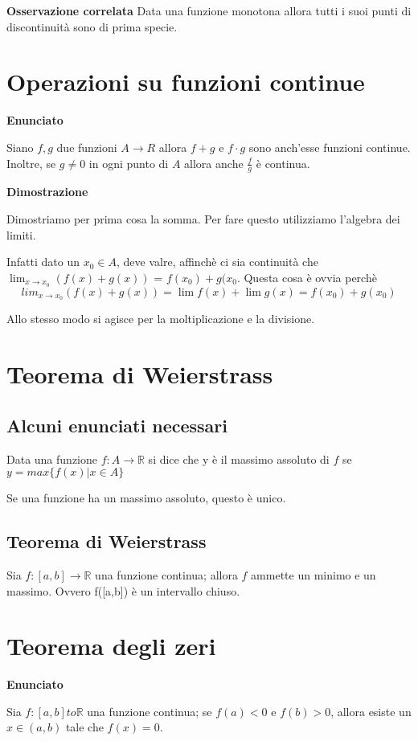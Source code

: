 \textbf{Osservazione correlata} Data una funzione monotona allora tutti i suoi punti di discontinuità sono di prima specie.

\section{Operazioni su funzioni continue}

\textbf{Enunciato}

Siano $f,g$ due funzioni $A\to R$ allora $f+g$ e $f\cdot g$ sono anch'esse funzioni continue. Inoltre, se $g \neq 0$ in ogni punto di $A$ allora anche $\frac{f}{g}$ è continua.

\textbf{Dimostrazione}

Dimostriamo per prima cosa la somma. Per fare questo utilizziamo l'algebra dei limiti. 

Infatti dato un $x_0 \in A$, deve valre, affinchè ci sia continuità che $\lim_{x\to x_0}(f(x)+g(x))$ = $f(x_0)+g(x_0$. Questa cosa è ovvia perchè $$lim_{x\to x_0}(f(x)+g(x)) = \lim f(x) + \lim g(x) = f(x_0) + g(x_0)$$

Allo stesso modo si agisce per la moltiplicazione e la divisione.

\section{Teorema di Weierstrass}

\subsection{Alcuni enunciati necessari}
Data una funzione $f: A \to \mathbb{R}$ si dice che y è il massimo assoluto di $f$ se $y = max\{f(x) | x\in A\}$ 

Se una funzione ha un massimo assoluto, questo è unico.

\subsection{Teorema di Weierstrass}
Sia $f: [a,b] \to \mathbb{R}$ una funzione continua; allora $f$ ammette un minimo e un massimo. Ovvero f([a,b]) è un intervallo chiuso.

\section{Teorema degli zeri}

\textbf{Enunciato}

Sia $f: [a,b] to \mathbb{R}$ una funzione continua; se $f(a)<0$ e $f(b)>0$, allora esiste un $x\in(a,b)$ tale che $f(x)=0$.

